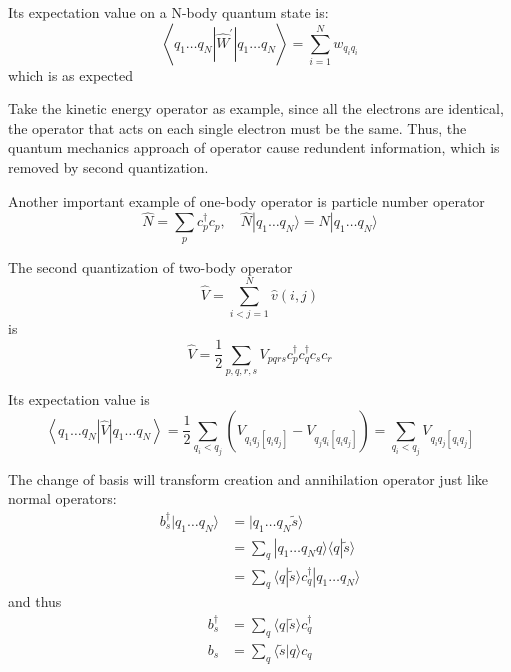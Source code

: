 Its expectation value on a N-body quantum state is:
\begin{equation}
\left\langle q_{1} \ldots q_{N}\left|\hat{W}^{\prime}\right| q_{1} \ldots q_{N}\right\rangle=\sum_{i=1}^{N} w_{q_{i} q_{i}}
\end{equation}
which is as expected

Take the kinetic energy operator as example, since all the electrons are identical, the operator that acts on each single electron must be the same.
Thus, the quantum mechanics approach of operator cause redundent information, which is removed by second quantization.

Another important example of one-body operator is particle number operator
\begin{equation}
\hat{N}=\sum_{p} c_{p}^{\dagger} c_{p}, \quad \hat{N} | q_{1} \ldots q_{N} \rangle=N | q_{1} \ldots q_{N} \rangle
\end{equation}


The second quantization of two-body operator
\begin{equation}
\hat{V}=\sum_{i<j=1}^{N} \hat{v}(i, j)
\end{equation}
is
\begin{equation}
\hat{V}=\frac{1}{2} \sum_{p, q, r, s} V_{p q r s} c_{p}^{\dagger} c_{q}^{\dagger} c_{s} c_{r}
\end{equation}

Its expectation value is
\begin{equation}
\left\langle q_{1} \ldots q_{N}|\hat{V}| q_{1} \ldots q_{N}\right\rangle=\frac{1}{2} \sum_{q_{i}<q_{j}}\left(V_{q_{i} q_{j}\left[q_{i} q_{j}\right]}-V_{q_{j} q_{i}\left[q_{i} q_{j}\right]}\right)=\sum_{q_{i}<q_{j}} V_{q_{i} q_{j}\left[q_{i} q_{j}\right]}
\end{equation}

The change of basis will transform creation and annihilation operator just like normal operators:
\begin{equation}
\begin{aligned} 
	b_{s}^{\dagger} | q_{1} \ldots q_{N} \rangle&= | q_{1} \ldots q_{N} \tilde{s} \rangle
	\\
	&= \sum_{q} | q_{1} \ldots q_{N} q \rangle\langle q | \tilde{s}\rangle
	\\
	&=\sum_{q}\langle q | \tilde{s}\rangle c_{q}^{\dagger} | q_{1} \ldots q_{N} \rangle
\end{aligned}
\end{equation}
and thus
\begin{equation}
\begin{aligned}
	b_{s}^{\dagger}&=\sum_{q}\langle q | \tilde{s}\rangle c_{q}^{\dagger}
	\\
	b_{s}&=\sum_{q}\langle\tilde{s} | q\rangle c_{q}
\end{aligned}
\end{equation}

